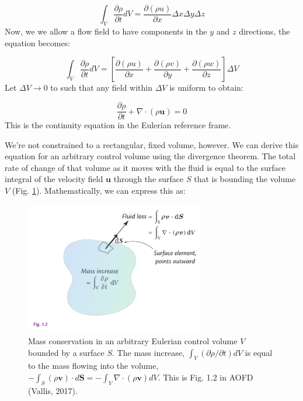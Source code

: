 \documentclass[12pt]{article}
\numberwithin{equation}{section}
\numberwithin{figure}{section}
\numberwithin{table}{section}
\begin{document}
\begin{equation}
  \int_V \frac{\partial \rho}{\partial t} dV =
  \frac{\partial (\rho u)}{\partial x} \Delta x \Delta y \Delta z
\end{equation}
Now, we we allow a flow field to have components in the $y$ and $z$ directions,
the equation becomes:

\begin{equation}
  \int_V \frac{\partial \rho}{\partial t} dV =
  \left[\frac{\partial (\rho u)}{\partial x} + \frac{\partial (\rho v)}{\partial y} + \frac{\partial (\rho w)}{\partial z} \right] \Delta V
\end{equation}
Let $\Delta V \to 0$ to such that any field within $\Delta V$ is uniform to obtain:

\begin{equation}
  \frac{\partial \rho}{\partial t} + \nabla \cdot (\rho \mathbf{u}) = 0
  \label{eq:continuity_eulerian}
\end{equation}
This is the continuity equation in the Eulerian reference frame.

We're not constrained to a rectangular, fixed volume, however.
We can derive this equation for an arbitrary control volume using the divergence
theorem.
The total rate of change of that volume as it moves with the fluid is equal to
the surface integral of the velocity field $\mathbf{u}$ through the surface
$S$ that is bounding the volume $V$ (Fig. \ref{fig:continuity2}).
Mathematically, we can express this as:

\begin{figure}[h]
  \centering
  \includegraphics[width=0.7\textwidth]{assets/fig_continuity2.pdf}
  \caption{
    Mass conservation in an arbitrary Eulerian control volume $V$ bounded by a
    surface $S$. The mass increase, $\int_V(\partial \rho/\partial t)dV$
    is equal to the mass flowing into the volume,
    $-\int_S(\rho\mathbf{v}) \cdot d\mathbf{S} = -\int_V \nabla \cdot (\rho\mathbf{v})dV$.
    This is Fig. 1.2 in AOFD (Vallis, 2017).
  }
  \label{fig:continuity2}
\end{figure}
\end{document}
